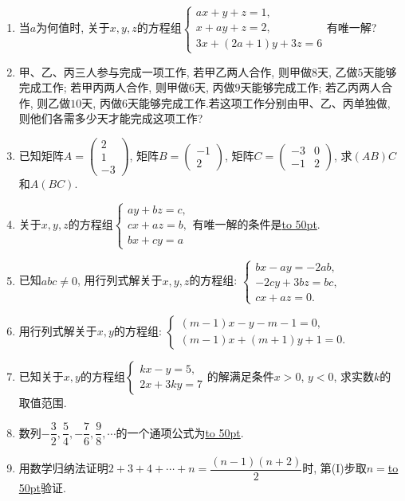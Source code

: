 \documentclass[10pt,a4paper]{article}
\newcommand{\blank}[1]{\underline{\hbox to #1pt{}}}
\begin{document}
\begin{enumerate}[1.]
\item 当$a$为何值时, 关于$x,y,z$的方程组$\begin{cases}    ax+y+z=1,  \\x+ay+z=2,  \\3x+(2a+1)y+3z=6  \end{cases}$有唯一解?
\item 甲、乙、丙三人参与完成一项工作, 若甲乙两人合作, 则甲做$8$天, 乙做$5$天能够完成工作; 若甲丙两人合作, 则甲做$6$天, 丙做$9$天能够完成工作; 若乙丙两人合作, 则乙做$10$天, 丙做$6$天能够完成工作.若这项工作分别由甲、乙、丙单独做, 则他们各需多少天才能完成这项工作?
\item 已知矩阵$A=\begin{pmatrix}    2  \\1  \\-3  \end{pmatrix}$, 矩阵$B=\begin{pmatrix}-1 \\ 2  \end{pmatrix}$, 矩阵$C=\begin{pmatrix}    -3 & 0  \\-1 & 2  \end{pmatrix}$, 求$(AB)C$和$A(BC)$.
\item 关于$x,y,z$的方程组$\begin{cases}    ay+bz=c,  \\cx+az=b,  \\bx+cy=a  \end{cases}$有唯一解的条件是\blank{50}.
\item 已知$abc\ne 0$, 用行列式解关于$x,y,z$的方程组:
$\begin{cases}
    bx-ay=-2ab,  \\-2cy+3bz=bc, \\cx+az=0.  \end{cases}$
\item 用行列式解关于$x,y$的方程组:
$\begin{cases} (m-1)x-y-m-1=0,  \\(m-1)x+(m+1)y+1=0.  \end{cases}$
\item 已知关于$x,y$的方程组$\begin{cases}    kx-y=5,  \\2x+3ky=7  \end{cases}$的解满足条件$x>0$, $y<0$, 求实数$k$的取值范围.
\item 数列$-\dfrac 32,\dfrac 54,-\dfrac 76,\dfrac 98,\cdots$的一个通项公式为\blank{50}.
\item 用数学归纳法证明$2+3+4+\cdots +n=\dfrac{(n-1)(n+2)}2$时, 第(I)步取$n=$\blank{50}验证.

\end{enumerate}
\end{document}
